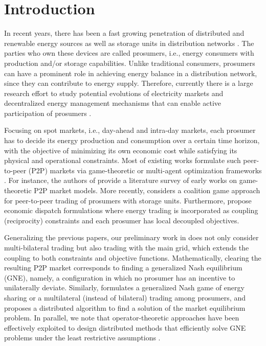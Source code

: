 \documentclass{IEEEtran}  %
\newcommand{\0}{\mathbf{0}}
\newcommand{\1}{\mathbf{1}}
\begin{document}


	\section{Introduction}

In recent years, there has been a fast growing penetration of distributed and renewable energy sources as well as storage units in distribution networks \cite{parag2016}. The parties who own these devices are called prosumers, i.e., energy consumers with production and/or storage capabilities. Unlike traditional consumers, prosumers can have a prominent role in achieving energy balance in a distribution network, since they can contribute to energy supply.  Therefore, currently there is a large research effort to study potential evolutions of electricity markets and decentralized energy management mechanisms that can enable active participation of prosumers \cite{parag2016,tushar2018,liu2019,sousa2019}.

Focusing on spot markets, i.e., day-ahead and intra-day markets, each prosumer has to decide its energy production and consumption over a certain time horizon, with the objective of minimizing its own economic cost while satisfying its physical and operational constraints. 
Most of existing works formulate such peer-to-peer (P2P) markets via game-theoretic or multi-agent optimization frameworks \cite{tushar2018,tushar2020,lecadre2020,cui2020,zhang2020,baroche2019,sorin2019}. For instance, the authors of \cite{tushar2018} provide a literature survey of early works on game-theoretic P2P market models. {More recently, \cite{tushar2020} considers a coalition game approach for peer-to-peer trading of prosumers with storage units.}  Furthermore, \cite{lecadre2020,cui2020,zhang2020,baroche2019,sorin2019} propose economic dispatch formulations where energy trading is incorporated as coupling (reciprocity) constraints and each prosumer has local decoupled objectives. 

Generalizing the previous papers, our preliminary work in  \cite{belgioioso2020energy} does not only consider multi-bilateral trading  but also trading with the main grid, which extends the coupling to both constraints and objective functions. 
%
Mathematically, clearing the resulting P2P market corresponds to finding a generalized Nash equilibrium (GNE), namely, a configuration in which no prosumer has an incentive to unilaterally deviate. 
%
Similarly, \cite{wang2021} formulates a generalized Nash game of energy sharing or a multilateral (instead of bilateral) trading among prosumers, and proposes a distributed algorithm to find a solution of the market equilibrium problem. 
%
In parallel, we note that operator-theoretic approaches have been effectively exploited to design distributed methods that efficiently solve GNE problems under the least restrictive assumptions \cite{paccagnan2019,belgioioso2020b,gadjov2020single,belgioioso2020semi,
	bianchi2020fast}.
\end{document}
